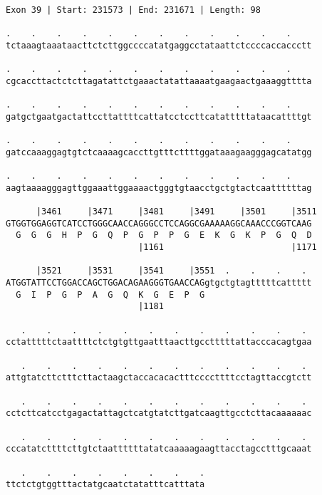 \documentclass{article}
\begin{document}
\begin{Verbatim}
Exon 39 | Start: 231573 | End: 231671 | Length: 98
 
.    .    .    .    .    .    .    .    .    .    .    .    
tctaaagtaaataacttctcttggccccatatgaggcctataattctccccaccaccctt
  
.    .    .    .    .    .    .    .    .    .    .    .    
cgcaccttactctcttagatattctgaaactatattaaaatgaagaactgaaaggtttta
  
.    .    .    .    .    .    .    .    .    .    .    .    
gatgctgaatgactattccttattttcattatcctccttcatatttttataacattttgt
  
.    .    .    .    .    .    .    .    .    .    .    .    
gatccaaaggagtgtctcaaaagcaccttgtttcttttggataaagaagggagcatatgg
  
.    .    .    .    .    .    .    .    .    .    .    .    
aagtaaaagggagttggaaattggaaaactgggtgtaacctgctgtactcaattttttag
  
      |3461     |3471     |3481     |3491     |3501     |3511
GTGGTGGAGGTCATCCTGGGCAACCAGGGCCTCCAGGCGAAAAAGGCAAACCCGGTCAAG
  G  G  G  H  P  G  Q  P  G  P  P  G  E  K  G  K  P  G  Q  D
                          |1161                         |1171
  
      |3521     |3531     |3541     |3551  .    .    .    . 
ATGGTATTCCTGGACCAGCTGGACAGAAGGGTGAACCAGgtgctgtagtttttcattttt
  G  I  P  G  P  A  G  Q  K  G  E  P  G                     
                          |1181                             
  
   .    .    .    .    .    .    .    .    .    .    .    . 
cctatttttctaattttctctgtgttgaatttaacttgcctttttattacccacagtgaa
  
   .    .    .    .    .    .    .    .    .    .    .    . 
attgtatcttctttcttactaagctaccacacactttccccttttcctagttaccgtctt
  
   .    .    .    .    .    .    .    .    .    .    .    . 
cctcttcatcctgagactattagctcatgtatcttgatcaagttgcctcttacaaaaaac
  
   .    .    .    .    .    .    .    .    .    .    .    . 
cccatatcttttcttgtctaattttttatatcaaaaagaagttacctagcctttgcaaat
  
   .    .    .    .    .    .    .    .
ttctctgtggtttactatgcaatctatatttcatttata
\end{Verbatim}
\newpage
\end{document}
